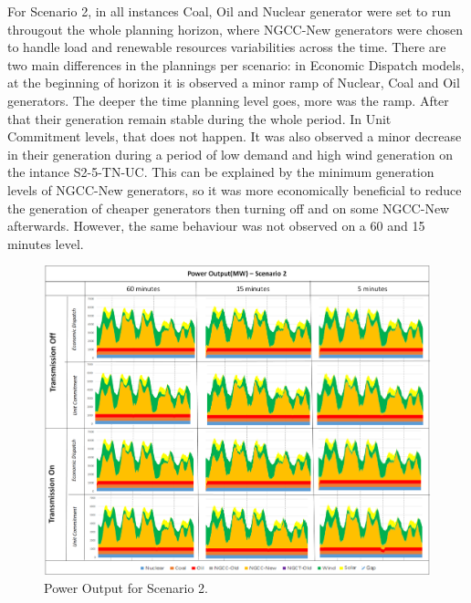 \documentclass[12pt,LUDisStyle,twosided]{book}
\begin{document}
For Scenario 2, in all instances Coal, Oil and Nuclear generator were set to run througout the whole planning horizon, where NGCC-New generators were chosen to handle load and renewable resources variabilities across the time. There are two main differences in the plannings per scenario: in Economic Dispatch models, at the beginning of horizon it is observed a minor ramp of Nuclear, Coal and Oil generators. The deeper the time planning level goes, more was the ramp. After that their generation remain stable during the whole period. In Unit Commitment levels, that does not happen. It was also observed a minor decrease in their generation during a period of low demand and high wind generation on the intance S2-5-TN-UC. This can be explained by the minimum generation levels of NGCC-New generators, so it was more economically beneficial to reduce the generation of cheaper generators then turning off and on some NGCC-New afterwards. However, the same behaviour was not observed on a 60 and 15 minutes level.


\begin{figure}[H] 
  \centering
	  \includegraphics[width=\textwidth,height=\textheight,keepaspectratio]{PowerOutputScenario2.png}
  \caption{Power Output for Scenario 2.}
  \label{fig:powerOutputScenario2}
\end{figure}
\end{document}
